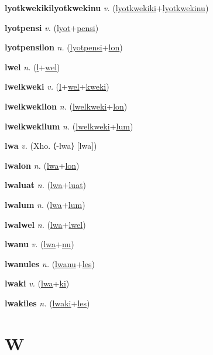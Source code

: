 \textbf{\hypertarget{lyotkwekikilyotkwekinu}{lyotkwekikilyotkwekinu}} \textit{v.} (\hyperlink{lyotkwekiki}{lyotkwekiki}+\allowbreak \hyperlink{lyotkwekinu}{lyotkwekinu})


\textbf{\hypertarget{lyotpensi}{lyotpensi}} \textit{v.} (\hyperlink{lyot}{lyot}+\allowbreak \hyperlink{pensi}{pensi})


\textbf{\hypertarget{lyotpensilon}{lyotpensilon}} \textit{n.} (\hyperlink{lyotpensi}{lyotpensi}+\allowbreak \hyperlink{lon}{lon})


\textbf{\hypertarget{lwel}{lwel}} \textit{n.} (\hyperlink{l}{l}+\allowbreak \hyperlink{wel}{wel})


\textbf{\hypertarget{lwelkweki}{lwelkweki}} \textit{v.} (\hyperlink{l}{l}+\allowbreak \hyperlink{wel}{wel}+\allowbreak \hyperlink{kweki}{kweki})


\textbf{\hypertarget{lwelkwekilon}{lwelkwekilon}} \textit{n.} (\hyperlink{lwelkweki}{lwelkweki}+\allowbreak \hyperlink{lon}{lon})


\textbf{\hypertarget{lwelkwekilum}{lwelkwekilum}} \textit{n.} (\hyperlink{lwelkweki}{lwelkweki}+\allowbreak \hyperlink{lum}{lum})


\textbf{\hypertarget{lwa}{lwa}} \textit{v.} (Xho. ⟨-lwa⟩ [lwa])


\textbf{\hypertarget{lwalon}{lwalon}} \textit{n.} (\hyperlink{lwa}{lwa}+\allowbreak \hyperlink{lon}{lon})


\textbf{\hypertarget{lwaluat}{lwaluat}} \textit{n.} (\hyperlink{lwa}{lwa}+\allowbreak \hyperlink{luat}{luat})


\textbf{\hypertarget{lwalum}{lwalum}} \textit{n.} (\hyperlink{lwa}{lwa}+\allowbreak \hyperlink{lum}{lum})


\textbf{\hypertarget{lwalwel}{lwalwel}} \textit{n.} (\hyperlink{lwa}{lwa}+\allowbreak \hyperlink{lwel}{lwel})


\textbf{\hypertarget{lwanu}{lwanu}} \textit{v.} (\hyperlink{lwa}{lwa}+\allowbreak \hyperlink{nu}{nu})


\textbf{\hypertarget{lwanules}{lwanules}} \textit{n.} (\hyperlink{lwanu}{lwanu}+\allowbreak \hyperlink{les}{les})


\textbf{\hypertarget{lwaki}{lwaki}} \textit{v.} (\hyperlink{lwa}{lwa}+\allowbreak \hyperlink{ki}{ki})


\textbf{\hypertarget{lwakiles}{lwakiles}} \textit{n.} (\hyperlink{lwaki}{lwaki}+\allowbreak \hyperlink{les}{les})


\section{W}

